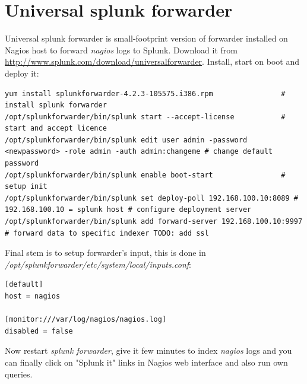 \documentclass[10pt,a4paper,final]{report}
\begin{document}
\section{Universal splunk forwarder}
Universal splunk forwarder is small-footprint version of forwarder installed on Nagios host to forward \emph{nagios} logs to Splunk. Download it from \url{http://www.splunk.com/download/universalforwarder}. Install, start on boot and deploy it:
\begin{lstlisting}
yum install splunkforwarder-4.2.3-105575.i386.rpm                # install splunk forwarder
/opt/splunkforwarder/bin/splunk start --accept-license           # start and accept licence
/opt/splunkforwarder/bin/splunk edit user admin -password <newpassword> -role admin -auth admin:changeme # change default password
/opt/splunkforwarder/bin/splunk enable boot-start                # setup init
/opt/splunkforwarder/bin/splunk set deploy-poll 192.168.100.10:8089 # 192.168.100.10 = splunk host # configure deployment server
/opt/splunkforwarder/bin/splunk add forward-server 192.168.100.10:9997 # forward data to specific indexer TODO: add ssl
\end{lstlisting}
Final stem is to setup forwarder's input, this is done in \emph{/opt/splunkforwarder/etc/system/local/inputs.conf}:
\begin{lstlisting}
[default]
host = nagios

[monitor:///var/log/nagios/nagios.log]
disabled = false
\end{lstlisting}
Now restart \emph{splunk forwarder}, give it few minutes to index \emph{nagios} logs and you can finally click on "Splunk it" links in Nagios web interface and also run own queries.
\newpage
\appendix
\end{document}
